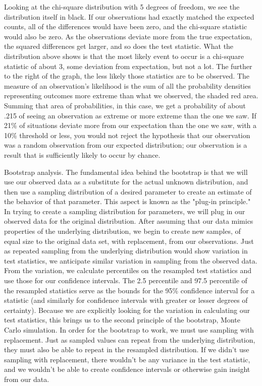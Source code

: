 \par Looking at the chi-square distribution with 5 degrees of freedom, we see the distribution itself in black.  If our observations had exactly matched the expected counts, all of the differences would have been zero, and the chi-square statistic would also be zero.  As the observations deviate more from the true expectation, the squared differences get larger, and so does the test statistic.  What the distribution above shows is that the most likely event to occur is a chi-square statistic of about 3, some deviation from expectation, but not a lot.  The further to the right of the graph, the less likely those statistics are to be observed.  The measure of an observation's likelihood is the sum of all the probability densities representing outcomes more extreme than what we observed, the shaded red area.  Summing that area of probabilities, in this case, we get a probability of about .215 of seeing an observation as extreme or more extreme than the one we saw.  If 21\% of situations deviate more from our expectation than the one we saw, with a 10\% threshold or less, you would not reject the hypothesis that our observation was a random observation from our expected distribution; our observation is a result that is sufficiently likely to occur by chance.

\par Bootstrap analysis.  The fundamental idea behind the bootstrap is that we will use our observed data as a substitute for the actual unknown distribution, and then use a sampling distribution of a desired parameter to create an estimate of the behavior of that parameter.  This aspect is known as the "plug-in principle."  In trying to create a sampling distribution for parameters, we will plug in our observed data for the original distribution\citep{BOOK:1}.   After assuming that our data mimics properties of the underlying distribution, we begin to create new samples, of equal size to the original data set, with replacement, from our observations.  Just as repeated sampling from the underlying distribution would show variation in test statistics, we anticipate similar variation in sampling from the observed data.  From the variation, we calculate percentiles on the resampled test statistics and use those for our confidence intervals.  The 2.5 percentile and 97.5 percentile of the resampled statistics serve as the bounds for the 95\% confidence interval for a statistic (and similarly for confidence intervals with greater or lesser degrees of certainty).  Because we are explicitly looking for the variation in calculating our test statistics, this brings us to the second principle of the bootstrap, Monte Carlo simulation.  In order for the bootstrap to work, we must use sampling with replacement\citep{BOOK:1}.  Just as sampled values can repeat from the underlying distribution, they must also be able to repeat in the resampled distribution.  If we didn't use sampling with replacement, there wouldn't be any variance in the test statistic, and we wouldn't be able to create confidence intervals or otherwise gain insight from our data.

